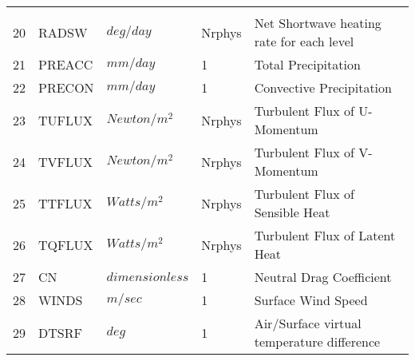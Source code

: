 \begin{tabular}{lllll}
\begin{minipage}[t]{3in}
         \end{minipage}\\
20 & RADSW    &  $deg/day$ &  Nrphys 
         &\begin{minipage}[t]{3in}
          {Net Shortwave heating rate for each level}
         \end{minipage}\\
21 & PREACC   &  $mm/day$ &  1
         &\begin{minipage}[t]{3in}
          {Total Precipitation}
         \end{minipage}\\
22 & PRECON   &  $mm/day$ &  1
         &\begin{minipage}[t]{3in}
          {Convective Precipitation}
         \end{minipage}\\
23 & TUFLUX   &  $Newton/m^2$ &  Nrphys
         &\begin{minipage}[t]{3in}
          {Turbulent Flux of U-Momentum}
         \end{minipage}\\
24 & TVFLUX   &  $Newton/m^2$ &  Nrphys
         &\begin{minipage}[t]{3in}
          {Turbulent Flux of V-Momentum}
         \end{minipage}\\
25 & TTFLUX   &  $Watts/m^2$ &  Nrphys
         &\begin{minipage}[t]{3in}
          {Turbulent Flux of Sensible Heat}
         \end{minipage}\\
26 & TQFLUX   &  $Watts/m^2$ &  Nrphys
         &\begin{minipage}[t]{3in}
          {Turbulent Flux of Latent Heat}
         \end{minipage}\\
27 & CN       &  $dimensionless$ &  1
         &\begin{minipage}[t]{3in}
          {Neutral Drag Coefficient}
         \end{minipage}\\
28 & WINDS     &  $m/sec$ &  1
         &\begin{minipage}[t]{3in}
          {Surface Wind Speed}
         \end{minipage}\\
29 & DTSRF     &  $deg$ &  1
         &\begin{minipage}[t]{3in}
          {Air/Surface virtual temperature difference}
         \end{minipage}\\

\end{tabular}

